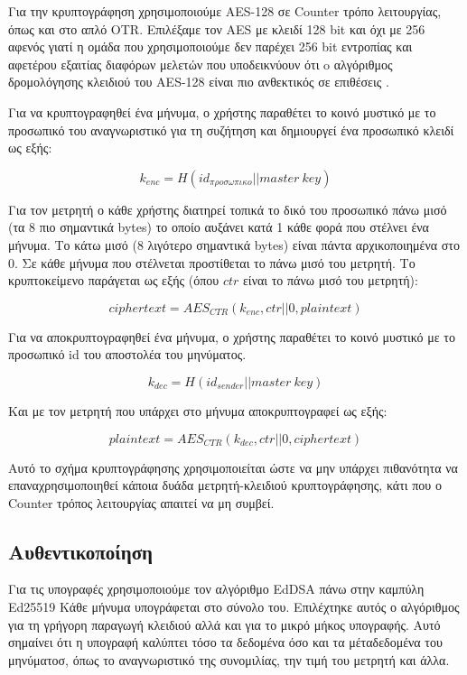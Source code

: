 Για την κρυπτογράφηση χρησιμοποιούμε AES-128 σε Counter τρόπο λει\-του\-ργί\-ας, όπως και στο απλό OTR.
Επιλέξαμε τον AES με κλειδί 128 bit και όχι με 256 αφενός γιατί η ομάδα \dhname που χρησιμοποιούμε δεν παρέχει 256 bit εντροπίας και αφετέρου εξαιτίας διαφόρων μελετών που υποδεικνύουν ότι o αλγόριθμος δρομολόγησης κλειδιού του AES-128 είναι πιο ανθεκτικός σε επιθέσεις \cite{aes-key-recov} \cite{rijndael-improved-analysis}.

Για να κρυπτογραφηθεί ένα μήνυμα, ο χρήστης παραθέτει το κοινό μυστικό με το προσωπικό του αναγνωριστικό για τη συζήτηση και δημιουργεί ένα προ\-σω\-πι\-κό κλειδί ως εξής:

\[
k_{enc} = H(id_{προσωπικο} || master\ key)
\]

Για τον μετρητή ο κάθε χρήστης διατηρεί τοπικά το δικό του προσωπικό πάνω μισό (τα 8 πιο σημαντικά bytes) το οποίο αυξάνει κατά 1 κάθε φορά που στέλνει ένα μήνυμα.
Το κάτω μισό (8 λιγότερο σημαντικά bytes) είναι πάντα αρχικοποιημένα στο 0.
Σε κάθε μήνυμα που στέλνεται προστίθεται το πάνω μισό του μετρητή.
Το κρυπτοκείμενο παράγεται ως εξής (όπου $ctr$ είναι το πάνω μισό του μετρητή):

\[
ciphertext = AES_{CTR}(k_{enc}, ctr||0, plaintext)
\]

Για να αποκρυπτογραφηθεί ένα μήνυμα, ο χρήστης παραθέτει το κοινό μυστικό με το προσωπικό id του αποστολέα του μηνύματος.

\[
k_{dec} = H(id_{sender} || master\ key)
\]

Και με τον μετρητή που υπάρχει στο μήνυμα αποκρυπτογραφεί ως εξής:

\[
plaintext = AES_{CTR}(k_{dec}, ctr||0, ciphertext)
\]

Αυτό το σχήμα κρυπτογράφησης χρησιμοποιείται ώστε να μην υπάρχει πι\-θα\-νό\-τη\-τα να επαναχρησιμοποιηθεί κάποια δυάδα μετρητή-κλειδιού κρυπτογράφησης, κάτι που ο Counter τρόπος λειτουργίας απαιτεί να μη συμβεί.

\subsection{Αυθεντικοποίηση}

Για τις υπογραφές χρησιμοποιούμε τον αλγόριθμο EdDSA πάνω στην καμπύλη Ed25519
Κάθε μήνυμα υπογράφεται στο σύνολο του.
Επιλέχτηκε αυτός ο αλγόριθμος για τη γρήγορη παραγωγή κλειδιού αλλά και για το μικρό μήκος υπογραφής.
Αυτό σημαίνει ότι η υπογραφή καλύπτει τόσο τα δεδομένα όσο και τα μέταδεδομένα του μηνύματοσ, όπως το αναγνωριστικό της συνομιλίας, την τιμή του μετρητή και άλλα.
